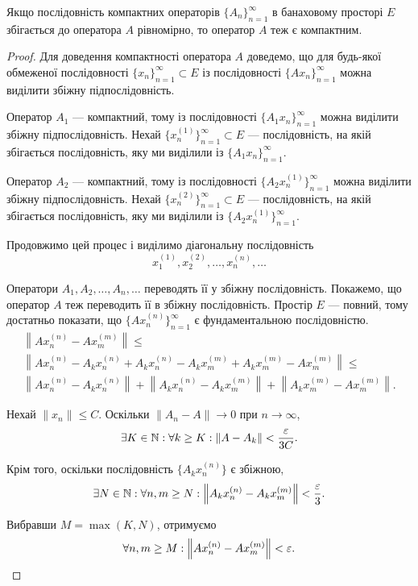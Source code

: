 \begin{theorem}
Якщо послідовність компактних
операторів $\{A_n\}_{n = 1}^\infty$
в банаховому просторі $E$ збігається
до оператора $A$ рівномірно, то оператор $A$ теж є
компактним.
\end{theorem}

\begin{proof}
Для доведення компактності оператора $A$
доведемо, що для будь-якої обмеженої послідовності
$\{x_n\}_{n = 1}^\infty \subset E$ із послідовності $\{Ax_n\}_{n = 1}^\infty$
можна виділити збіжну підпослідовність.

Оператор $A_1$ --- компактний, тому із послідовності
$\{A_1 x_n\}_{n = 1}^\infty$
можна виділити збіжну підпослідовність. Нехай
$\{x_n^{(1)}\}_{n = 1}^\infty \subset E$ --- послідовність, на якій збігається
послідовність, яку ми виділили із $\{A_1 x_n\}_{n = 1}^\infty$.

Оператор $A_2$ --- компактний, тому із послідовності
$\{A_2 x_n^{(1)}\}_{n = 1}^\infty$
можна виділити збіжну підпослідовність. Нехай
$\{x_n^{(2)}\}_{n = 1}^\infty \subset E$ --- послідовність, на якій збігається
послідовність, яку ми виділили із $\{A_2 x_n^{(1)}\}_{n = 1}^\infty$.

Продовжимо цей процес і виділимо діагональну
послідовність
\begin{equation*}
    x_1^{(1)}, x_2^{(2)}, \dots, x_n^{(n)}, \dots
\end{equation*}

Оператори $A_1, A_2, \dots, A_n, \dots$ переводять її у збіжну
послідовність. Покажемо, що оператор $A$ теж переводить її
в збіжну послідовність. Простір $E$ --- повний, тому
достатньо показати, що $\{Ax_n^{(n)}\}_{n = 1}^\infty$
є фундаментальною послідовністю.
\begin{multline*}
    \left\|A x_n^{(n)} - A x_m^{(m)}\right\| \le \\
    \left\|A x_n^{(n)} - A_k x_n^{(n)} +
      A_k x_n^{(n)} - A_k x_m^{(m)} +
      A_k x_m^{(m)} - A x_m^{(m)} \right\| \le \\
    \left\|A x_n^{(n)} - A_k x_n^{(n)}\right\| +
    \left\|A_k x_n^{(n)} - A_k x_m^{(m)}\right\| +
    \left\|A_k x_m^{(m)} - A x_m^{(m)} \right\|.
\end{multline*}

Нехай $\|x_n\| \le C$. Оскільки $\|A_n - A\| \to 0$ при $n \to \infty$,
\begin{equation*}
    \exists K \in \NN: \forall k \ge K:
    \left\|A - A_k\right\| < \frac{\epsilon}{3C}.
\end{equation*}

Крім того, оскільки послідовність $\{A_k x_n^{(n)}\}$ є збіжною,
\begin{equation*}
    \exists N \in \NN: \forall n, m \ge N:
    \left\|A_k x_n^{(n)} - A_k x_m^{(m)} \right\| < \frac{\epsilon}{3}.
    \end{equation*}

Вибравши $M = \max(K, N)$, отримуємо
\begin{equation*}
    \forall n, m \ge M:
    \left\|A x_n^{(n)} - A x_m^{(m)}\right\| < \epsilon. \qedhere
\end{equation*}
\end{proof}

